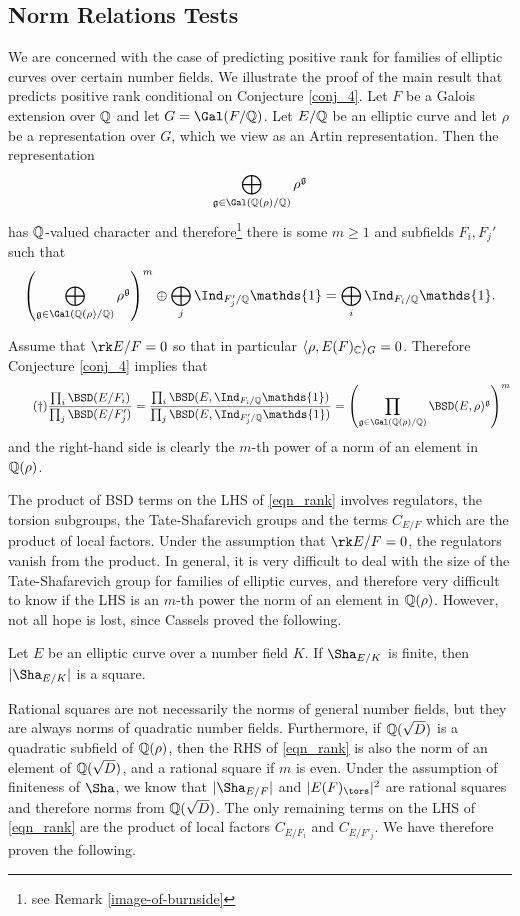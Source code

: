 \subsection{Norm Relations Tests}
We are concerned with the case of predicting positive rank for families of elliptic curves over certain number fields. We illustrate the proof of the main result that predicts positive rank conditional on Conjecture \ref{conj_4}. Let $F$ be a Galois extension over $\mathbb{Q}$ and let $G=\Gal(F/\QQ)$. Let $E/\mathbb{Q}$ be an elliptic curve and let $\rho$ be a representation over $G$, which we view as an Artin representation. Then the representation 
$$\bigoplus_{\mathfrak{g}\in\Gal(\QQ(\rho)/\QQ)}\rho^{\mathfrak{g}}$$
has $\mathbb{Q}$-valued character and therefore\footnote{see Remark \ref{image-of-burnside}} there is some $m\geq 1$ and subfields $F_i, F_j'$ such that 
$$\left(\bigoplus_{\mathfrak{g}\in\Gal(\QQ(\rho)/\QQ)}\rho^{\mathfrak{g}}\right)^m\oplus\bigoplus_j\Ind_{F'_j/\QQ}\mathds{1}=\bigoplus_i\Ind_{F_i/\QQ}\mathds{1}.$$

Assume that $\rk E/F=0$ so that in particular $\langle \rho, E(F)_{\mathbb{C}}\rangle_G=0$. Therefore Conjecture \ref{conj_4} implies that 
\begin{equation}\label{eqn_rank}\tag{\textdagger}
    \frac{\prod_i\BSD(E/F_i)}{\prod_j\BSD(E/F'_j)}=\frac{\prod_i\BSD(E,\Ind_{F_i/\QQ}\mathds{1})}{\prod_j\BSD(E, \Ind_{F'_j/\QQ}\mathds{1})}=\left(\prod_{\mathfrak{g}\in\Gal(\QQ(\rho)/\QQ)}\BSD(E,\rho)^{\mathfrak{g}}\right)^m
\end{equation}
and the right-hand side is clearly the $m$-th power of a norm of an element in $\mathbb{Q}(\rho)$. 

The product of BSD terms on the LHS of \eqref{eqn_rank} involves regulators, the torsion subgroups, the Tate-Shafarevich groups and the terms $C_{E/F}$ which are the product of local factors. Under the assumption that $\rk E/F=0$, the regulators vanish from the product. In general, it is very difficult to deal with the size of the Tate-Shafarevich group for families of elliptic curves, and therefore very difficult to know if the LHS is an $m$-th power the norm of an element in $\mathbb{Q}(\rho)$. However, not all hope is lost, since Cassels proved the following.

\begin{thm}
    Let $E$ be an elliptic curve over a number field $K$. If $\Sha_{E/K}$ is finite, then $|\Sha_{E/K}|$ is a square.
\end{thm}

Rational squares are not necessarily the norms of general number fields, but they are always norms of quadratic number fields. Furthermore, if $\mathbb{Q}(\sqrt{D})$ is a quadratic subfield of $\mathbb{Q}(\rho)$, then the RHS of \eqref{eqn_rank} is also the norm of an element of $\mathbb{Q}(\sqrt{D})$, and a rational square if $m$ is even. Under the assumption of finiteness of $\Sha$, we know that $|\Sha_{E/F}|$ and $|E(F)_{\tors}|^2$ are rational squares and therefore norms from $\mathbb{Q}(\sqrt{D})$. The only remaining terms on the LHS of \eqref{eqn_rank} are the product of local factors $C_{E/F_i}$ and $C_{E/F'_j}$. We have therefore proven the following.


